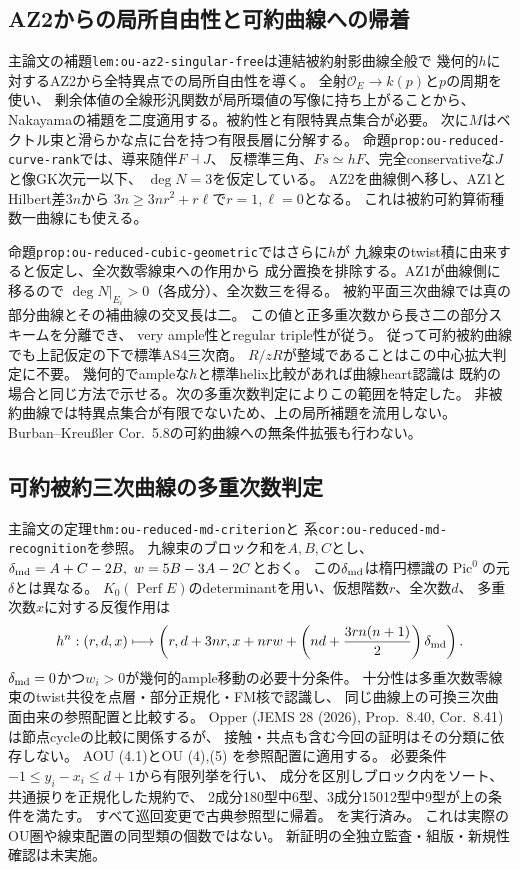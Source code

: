 \documentclass[11pt,a4paper]{ltjsarticle}
\newcommand{\Perf}{\operatorname{Perf}}
\newcommand{\Pic}{\operatorname{Pic}}
\begin{document}
\subsection*{AZ2からの局所自由性と可約曲線への帰着}
主論文の補題\texttt{lem:ou-az2-singular-free}は連結被約射影曲線全般で
幾何的$h$に対するAZ2から全特異点での局所自由性を導く。
全射$\mathcal O_E\to k(p)$と$p$の周期を使い、
剰余体値の全線形汎関数が局所環値の写像に持ち上がることから、
Nakayamaの補題を二度適用する。被約性と有限特異点集合が必要。
次に$M$はベクトル束と滑らかな点に台を持つ有限長層に分解する。
命題\texttt{prop:ou-reduced-curve-rank}では、導来随伴$F\dashv J$、
反標準三角、$Fs\simeq hF$、完全conservativeな$J$と像GK次元一以下、
$\deg N=3$を仮定している。
AZ2を曲線側へ移し、AZ1とHilbert差$3n$から
$3n\ge 3nr^2+r\ell$で$r=1,\ell=0$となる。
これは被約可約算術種数一曲線にも使える。

命題\texttt{prop:ou-reduced-cubic-geometric}ではさらに$h$が
九線束のtwist積に由来すると仮定し、全次数零線束への作用から
成分置換を排除する。AZ1が曲線側に移るので
$\deg N|_{E_i}>0$（各成分）、全次数三を得る。
被約平面三次曲線では真の部分曲線とその補曲線の交叉長は二。
この値と正多重次数から長さ二の部分スキームを分離でき、
very ample性とregular triple性が従う。
従って可約被約曲線でも上記仮定の下で標準AS4三次商。
$R/zR$が整域であることはこの中心拡大判定に不要。
幾何的でampleな$h$と標準helix比較があれば曲線heart認識は
既約の場合と同じ方法で示せる。次の多重次数判定によりこの範囲を特定した。
非被約曲線では特異点集合が有限でないため、上の局所補題を流用しない。
Burban--Kreu{\ss}ler Cor.~5.8の可約曲線への無条件拡張も行わない。

\subsection*{可約被約三次曲線の多重次数判定}
主論文の定理\texttt{thm:ou-reduced-md-criterion}と
系\texttt{cor:ou-reduced-md-recognition}を参照。
九線束のブロック和を$A,B,C$とし、
$\delta_{\rm md}=A+C-2B,\ w=5B-3A-2C$とおく。
この$\delta_{\rm md}$は楕円標識の$\Pic^0$の元$\delta$とは異なる。
$K_0(\Perf E)$のdeterminantを用い、仮想階数$r$、全次数$d$、
多重次数$x$に対する反復作用は
\[
 h^n:(r,d,x)\longmapsto
 \left(r,d+3nr,x+nrw+
       \left(nd+\frac{3r n(n+1)}2\right)\delta_{\rm md}\right).
\]
$\delta_{\rm md}=0$かつ$w_i>0$が幾何的ample移動の必要十分条件。
十分性は多重次数零線束のtwist共役を点層・部分正規化・FM核で認識し、
同じ曲線上の可換三次曲面由来の参照配置と比較する。
Opper (JEMS 28 (2026), Prop.~8.40, Cor.~8.41) は節点cycleの比較に関係するが、
接触・共点も含む今回の証明はその分類に依存しない。
AOU (4.1)とOU (4),(5) を参照配置に適用する。
必要条件$-1\leq y_i-x_i\leq d+1$から有限列挙を行い、
成分を区別しブロック内をソート、共通捩りを正規化した規約で、
2成分180型中6型、3成分15012型中9型が上の条件を満たす。
すべて巡回変更で古典参照型に帰着。
 を実行済み。
これは実際のOU圏や線束配置の同型類の個数ではない。
新証明の全独立監査・組版・新規性確認は未実施。
\end{document}
